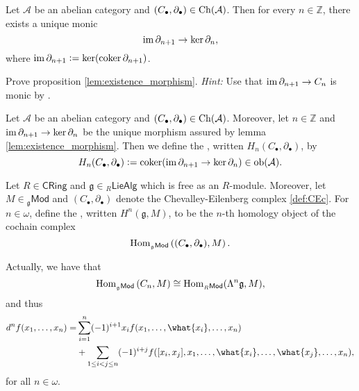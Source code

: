 \begin{proposition}
	\label{lem:existence_morphism}
	Let $\mathcal{A}$ be an abelian category and $(C_\bullet,\partial_\bullet) \in \operatorname{Ch}(\mathcal{A})$. Then for every $n \in \mathbb{Z}$, there exists a unique monic 
	\begin{equation*}
		\operatorname{im} \partial_{n + 1} \to \ker \partial_n,
	\end{equation*}
	\noindent where $\operatorname{im} \partial_{n + 1} := \ker(\operatorname{coker} \partial_{n + 1})$.
\end{proposition}

\begin{exercise}
	Prove proposition \ref{lem:existence_morphism}. \emph{Hint:} Use that $\operatorname{im} \partial_{n + 1} \to C_n$ is monic by \cite[199]{maclane:categories:1978}.
\end{exercise}

\begin{definition}
	Let $\mathcal{A}$ be an abelian category and $(C_\bullet,\partial_\bullet) \in \operatorname{Ch}(\mathcal{A})$. Moreover, let $n \in \mathbb{Z}$ and $\operatorname{im} \partial_{n + 1} \to \ker \partial_n$ be the unique morphism assured by lemma \ref{lem:existence_morphism}. Then we define the , written $H_n(C_\bullet,\partial_\bullet)$, by
	\begin{equation*}
		H_n(C_\bullet,\partial_\bullet) := \operatorname{coker}(\operatorname{im} \partial_{n + 1} \to \ker \partial_n) \in \operatorname{ob}(\mathcal{A}).
	\end{equation*} 
\end{definition}

\begin{definition}
	Let $R \in \mathsf{CRing}$ and $\mathfrak{g} \in {_{R}}\mathsf{LieAlg}$ which is free as an $R$-module. Moreover, let $M \in {_{\mathfrak{g}}}\mathsf{Mod}$ and $(C_\bullet,\partial_\bullet)$ denote the Chevalley-Eilenberg complex \ref{def:CEc}. For $n \in \omega$, define the , written $H^n(\mathfrak{g},M)$, to be the $n$-th homology object of the cochain complex 
	\begin{equation*}
		\Hom_{_{\mathfrak{g}}\mathsf{Mod}}\del[0]{(C_\bullet,\partial_\bullet),M}.
	\end{equation*}
\end{definition}

\begin{remark}
	Actually, we have that 
	\begin{equation*}
		\Hom_{_{\mathfrak{g}}\mathsf{Mod}}\del[0]{C_n,M} \cong \Hom_{_{R}\mathsf{Mod}}(\Lambda^n \mathfrak{g},M),
	\end{equation*}
	\noindent and thus
	\begin{align*}
		d^nf(x_1,\dots,x_n) =& \sum_{i = 1}^n(-1)^{i + 1}x_i f(x_1,\dots,\what{x_i},\dots,x_n)\\
		&+ \sum_{1 \leq i < j \leq n}(-1)^{i + j} f([x_i,x_j],x_1,\dots,\what{x_i},\dots,\what{x_j},\dots,x_n),
	\end{align*}
	\noindent for all $n \in \omega$.
\end{remark}

